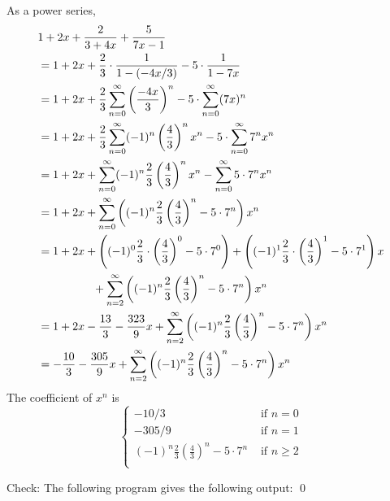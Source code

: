 As a power series,
\begin{align*}
&1 + 2x + \frac{2}{3 + 4x} + \frac{5}{7x - 1}
\\
&=
1 + 2x +
\frac{2}{3} \cdot \frac{1}{1 - (-4x/3)}
-
5 \cdot \frac{1}{1 - 7x}
\\
&=
1 + 2x +
\frac{2}{3} \sum_{n=0}^\infty \left(\frac{-4x}{3}\right)^n
-
5 \cdot \sum_{n=0}^\infty (7x)^n
\\
&=
1 + 2x +
\frac{2}{3} \sum_{n=0}^\infty (-1)^n\left(\frac{4}{3}\right)^n x^n
-
5 \cdot \sum_{n=0}^\infty 7^nx^n
\\
&=
1 + 2x +
\sum_{n=0}^\infty (-1)^n\frac{2}{3}\left(\frac{4}{3}\right)^n x^n
-
\sum_{n=0}^\infty 5 \cdot 7^nx^n
\\
&=
1 + 2x +
\sum_{n=0}^\infty
\left(
(-1)^n\frac{2}{3}\left(\frac{4}{3}\right)^n
-
5 \cdot 7^n
\right)x^n
\\
 &=
 1 + 2x +
 \left((-1)^0\frac{2}{3} \cdot \left(\frac{4}{3}\right)^0 - 5 \cdot 7^0\right)
 +
 \left((-1)^1\frac{2}{3}\cdot \left(\frac{4}{3}\right)^1 - 5\cdot 7^1\right)x
 \\
 &\hspace{1.7cm} +
 \sum_{n=2}^\infty
 \left(
 (-1)^n\frac{2}{3} \left( \frac{4}{3} \right)^n
 -
 5 \cdot 7^n
 \right)x^n
 \\
 &=
 1 + 2x - \frac{13}{3} -\frac{323}{9} x
 +
 \sum_{n=2}^\infty
 \left(  
 (-1)^n \frac{2}{3} \left( \frac{4}{3} \right)^n
 -
 5 \cdot 7^n
 \right)x^n
 \\
 &=
 -\frac{10}{3} -\frac{305}{9} x
 +
 \sum_{n=2}^\infty
 \left(  
 (-1)^n\frac{2}{3} \left( \frac{4}{3} \right)^n
 -
 5 \cdot 7^n
 \right)x^n
\end{align*}
The coefficient of $x^n$ is
\[
\begin{cases}
-10/3 & \text{ if } n = 0 \\
-305/9 & \text{ if } n = 1 \\
\displaystyle (-1)^n \frac{2}{3} \left( \frac{4}{3} \right)^n
-
5 \cdot 7^n & \text{ if } n \geq 2 \\
\end{cases}
\]

Check:
The following program
gives the following output:
\qed
